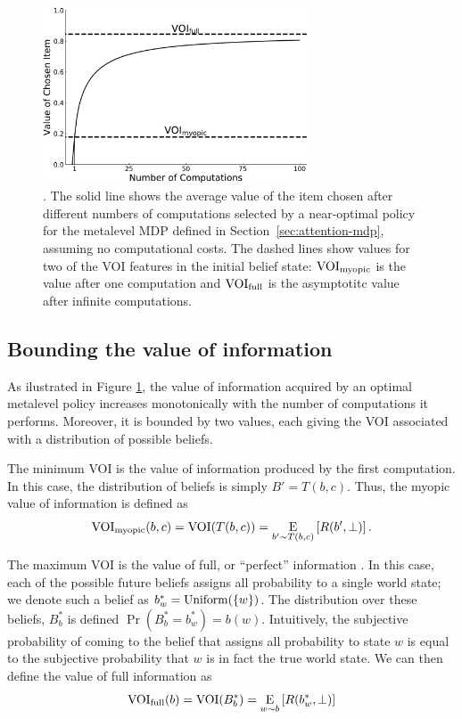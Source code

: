 \begin{figure}[b!]
  \centering
  \includegraphics[width=0.7\textwidth]{figs/attention/supp-voi-vpi.pdf}
  \caption{.
    The solid line shows the average value of the item chosen after different numbers of computations selected by a near-optimal policy for the metalevel MDP defined in Section~\ref{sec:attention-mdp}, assuming no computational costs. The dashed lines show values for two of the VOI features in the initial belief state: $\VOImy$ is the value after one computation and $\VPI$ is the asymptotitc value after infinite computations.
  }
  \label{fig:bmps-voi}
\end{figure}

\subsection{Bounding the value of information}

As ilustrated in Figure \ref{fig:bmps-voi}, the value of information acquired by an optimal metalevel policy increases monotonically with the number of computations it performs. Moreover, it is bounded by two values, each giving the VOI associated with a distribution of possible beliefs.

The minimum VOI is the value of information produced by the first computation. In this case, the distribution of beliefs is simply $B' = T(b, c)$. Thus, the myopic value of information is defined as
\begin{equation*}
  \VOImy(b,c) =  \VOI(T(b, c)) = \expectunder{R(b', \bot)}{b' \sim T(b, c)}.
\end{equation*}

The maximum VOI is the value of full, or ``perfect'' information \citep{howard1966information}. In this case, each of the possible future beliefs assigns all probability to a single world state; we denote such a belief as $b^*_w = \Uniform(\{w\})$.
The distribution over these beliefs, $B^*_b$ is defined $\Pr(B^*_b = b^*_w ) = b(w)$. Intuitively, the subjective probability of coming to the belief that assigns all probability to state $w$ is equal to the subjective probability that $w$ is in fact the true world state. We can then define the value of full information as
\begin{equation}
  \VPI(b) = \VOI(B^*_b) = \expectunder{R(b^*_w, \bot)}{w \sim b}
\end{equation}


